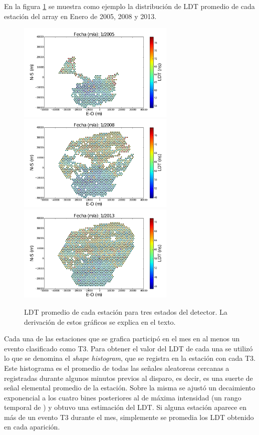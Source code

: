 	En la figura \ref{fig:ldtArray} se muestra como ejemplo la distribución de LDT promedio de cada estación del array en Enero de 2005, 2008 y 2013. 
	\begin{figure}[ht!]
		\begin{center}
			\includegraphics[width=0.67\textwidth]{fig/resultadosAuger/Out_decaytime_main_2005_01}
			\includegraphics[width=0.67\textwidth]{fig/resultadosAuger/Out_decaytime_main_2008_01} 
			\includegraphics[width=0.67\textwidth]{fig/resultadosAuger/Out_decaytime_main_2013_01}
			\caption{LDT promedio de cada estación para tres estados del detector. La derivación de estos gráficos se explica en el texto.}
			\label{fig:ldtArray}
		\end{center}
	\end{figure}
	Cada una de las estaciones que se grafica participó en el mes en al menos un evento clasificado como T3.
	Para obtener el valor del LDT de cada una se utilizó lo que se denomina el \emph{shape histogram}, que se registra en la estaci\'on con cada T3.
	Este histograma es el promedio de todas las señales aleatoreas cercanas a  registradas durante algunos minutos previos al disparo, es decir, es una suerte de señal elemental promedio de la estaci\'on.
	Sobre la misma se ajustó un decaimiento exponencial a los cuatro bines posteriores al de máxima intensidad (un rango temporal de ) y obtuvo una estimación del LDT.
	Si alguna estación aparece en más de un evento T3 durante el mes, simplemente se promedia los LDT obtenido en cada aparición.
	

